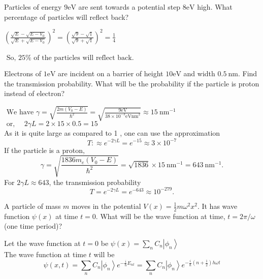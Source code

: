 \begin{enumerate}
\begin{minipage}{\textwidth}
	\item Particles of energy $9 \mathrm{eV}$ are sent towards a potential step $8 \mathrm{eV}$ high. What percentage of particles will reflect back?
\end{minipage}
\begin{answer}
	$\left(\frac{\sqrt{E}-\sqrt{E-V_{0}}}{\sqrt{E}+\sqrt{E-V_{0}}}\right)^{2}=\left(\frac{\sqrt{9}-\sqrt{1}}{\sqrt{9}+\sqrt{1}}\right)^{2}=\frac{1}{4}$\\\\
	$\text { So, } 25 \% \text { of the particles will reflect back. }$
\end{answer}
	\begin{minipage}{\textwidth}
	\item Electrons of $1 \mathrm{eV}$ are incident on a barrier of height $10 \mathrm{eV}$ and width $0.5 \mathrm{~nm} .$ Find the transmission probability. What will be the probability if the particle is proton instead of electron?
\end{minipage}
\begin{answer}
	$\text { We have } \gamma=\sqrt{\frac{2 m\left(V_{0}-E\right)}{\hbar^{2}}}=\sqrt{\frac{9 \mathrm{eV}}{38 \times 10^{-3} \mathrm{eVnm}^{2}}} \approx 15 \mathrm{~nm}^{-1}$\\
	$\text { or, } \quad 2 \gamma L=2 \times 15 \times 0.5=15$\\
	As it is quite large as compared to 1 , one can use the approximation
	$$
	T: \approx e^{-2 \gamma L}=e^{-15} \approx 3 \times 10^{-7}
	$$
	If the particle is a proton,
	$$
	\gamma=\sqrt{\frac{1836 m_{e}\left(V_{0}-E\right)}{\hbar^{2}}}=\sqrt{1836} \times 15 \mathrm{~nm}^{-1}=643 \mathrm{~nm}^{-1} .
	$$
	For $2 \gamma L \approx 643$, the transmission probability
	$$
	T=e^{-2 \gamma L}=e^{-643} \approx 10^{-279} .
	$$
\end{answer}
	\begin{minipage}{\textwidth}
	\item A particle of mass $m$ moves in the potential $V(x)=\frac{1}{2} m \omega^{2} x^{2} .$ It has wave function $\psi(x)$ at time $t=0$. What will be the wave function at time, $t=2 \pi / \omega$ (one time period)?
\end{minipage}
\begin{answer}
	Let the wave function at $t=0$ be $\psi(x)=\sum_{n} C_{n}\left|\phi_{n}\right\rangle$\\
	The wave function at time $t$ will be
	$$
	\psi(x, t)=\sum_{n} C_{n}\left|\phi_{n}\right\rangle e^{-\frac{i}{\hbar} E_{n t}}=\sum_{n} C_{n}\left|\phi_{n}\right\rangle e^{-\frac{i}{\hbar}\left(n+\frac{1}{2}\right) h\omega t}
$$
\end{answer}
\end{enumerate}
